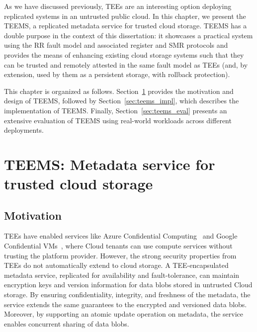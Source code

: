 \label{chap:tee}
\cleardoublepage{}

As we have discussed previously, \acp{TEE} are an interesting
option deploying replicated systems in an untrusted public cloud.
In this chapter, we present the \acf{TEEMS}, a replicated metadata
service for trusted cloud storage. \ac{TEEMS} has a double purpose in
the context of this dissertation: it showcases a practical system
using the \ac{RR} fault model and associated register and
\ac{SMR} protocols and provides the means of enhancing existing
cloud storage systems such that they can be trusted and remotely
attested in the same fault model as \acp{TEE} (and, by extension,
used by them as a persistent storage, with rollback protection).

This chapter is organized as follows.
Section~\ref{sec:teems_design}
provides the motivation and design of \ac{TEEMS}, followed by
Section~\ref{sec:teems_impl}, which describes the implementation
of \ac{TEEMS}. Finally, Section~\ref{sec:teems_eval} presents an
extensive evaluation of \ac{TEEMS} using real-world workloads
across different deployments.

\section{\ac{TEEMS}: Metadata service for trusted cloud
storage}\label{sec:teems_design}


\subsection{Motivation}

\acp{TEE} have enabled services like Azure Confidential
Computing~\cite{azure-conf} and Google Confidential
VMs~\cite{google-confVM}, where Cloud tenants can use compute
services without trusting the platform provider.  However, the
strong security properties from \acp{TEE} do not automatically
extend to cloud storage.  A
\ac{TEE}-encapsulated metadata service, replicated for
availability and fault-tolerance, can maintain encryption keys
and version information for data blobs stored in untrusted Cloud
storage.  By ensuring confidentiality, integrity, and freshness
of the metadata, the service extends the same guarantees to the
encrypted and versioned data blobs. Moreover, by supporting an
atomic update operation on metadata, the service enables
concurrent sharing of data blobs.

